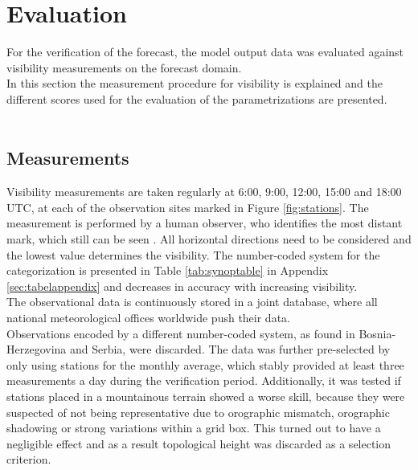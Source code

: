 
\section{Evaluation}
\label{sec:eval}
For the verification of the forecast, the model output data was evaluated against visibility measurements on the forecast domain. \\
In this section the measurement procedure for visibility is explained and the different scores used for the evaluation of the parametrizations are presented. \\ \\

\subsection{Measurements}
Visibility measurements are taken regularly at 6:00, 9:00, 12:00, 15:00 and 18:00 UTC, at each of the observation sites marked in Figure \ref{fig:stations}. The measurement is performed by a human observer, who identifies the most distant mark, which still can be seen \cite{WMO}. All horizontal directions need to be considered and the lowest value determines the visibility. The number-coded system for the categorization is presented in Table \ref{tab:synoptable} in Appendix \ref{sec:tabelappendix} and decreases in accuracy with increasing visibility. \\ 
The observational data is continuously stored in a joint database, where all national meteorological offices worldwide push their data.\\
Observations encoded by a different number-coded system, as found in Bosnia-Herzegovina and Serbia, were discarded. The data was further pre-selected by only using stations for the monthly average, which stably provided at least three measurements a day during the verification period. Additionally, it was tested if stations placed in a mountainous terrain showed a worse skill, because they were suspected of not being representative due to orographic mismatch, orographic shadowing or strong variations within a grid box. This turned out to have a negligible effect and as a result topological height was discarded as a selection criterion.

